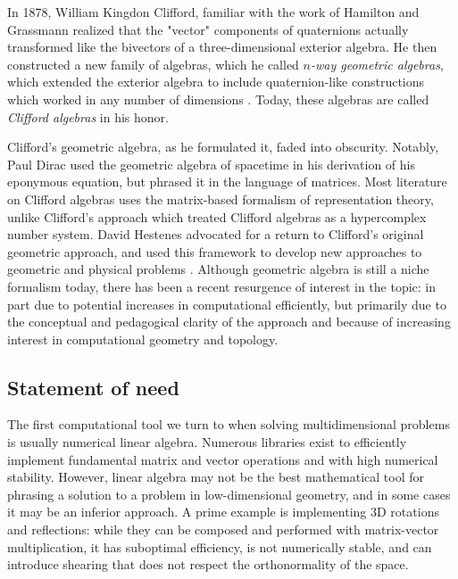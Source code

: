 \documentclass{juliacon}
\begin{document}
In 1878, William Kingdon Clifford, familiar with the work of Hamilton and Grassmann realized that the "vector" components of quaternions actually transformed like the bivectors of a three-dimensional exterior algebra.
He then constructed a new family of algebras, which he called \textit{$n$-way geometric algebras}, which extended the exterior algebra to include quaternion-like constructions which worked in any number of dimensions \cite{clifford-geometric-algebra}. Today, these algebras are called \textit{Clifford algebras} in his honor.

Clifford's geometric algebra, as he formulated it, faded into obscurity. Notably, Paul Dirac used the geometric algebra of spacetime in his derivation of his eponymous equation, but phrased it in the language of matrices. Most literature on Clifford algebras uses the matrix-based formalism of representation theory, unlike Clifford's approach which treated Clifford algebras as a hypercomplex number system. David Hestenes advocated for a return to Clifford's original geometric approach, and used this framework to develop new approaches to geometric and physical problems \cite{CA2GC} \cite{real-spinor-fields}. Although geometric algebra is still a niche formalism today, there has been a recent resurgence of interest in the topic: in part due to potential increases in computational efficiently, but primarily due to the conceptual and pedagogical clarity of the approach and because of increasing interest in computational geometry and topology. 

\subsection*{Statement of need}

The first computational tool we turn to when solving multidimensional problems is usually numerical linear algebra.
Numerous libraries exist to efficiently implement fundamental matrix and vector operations and with high numerical stability. However, linear algebra may not be the best mathematical tool for phrasing a solution to a problem in low-dimensional geometry, and in some cases it may be an inferior approach. A prime example is implementing 3D rotations and reflections: while they can be composed and performed with matrix-vector multiplication, it has suboptimal efficiency, is not numerically stable, and can introduce shearing that does not respect the orthonormality of the space.
\end{document}
